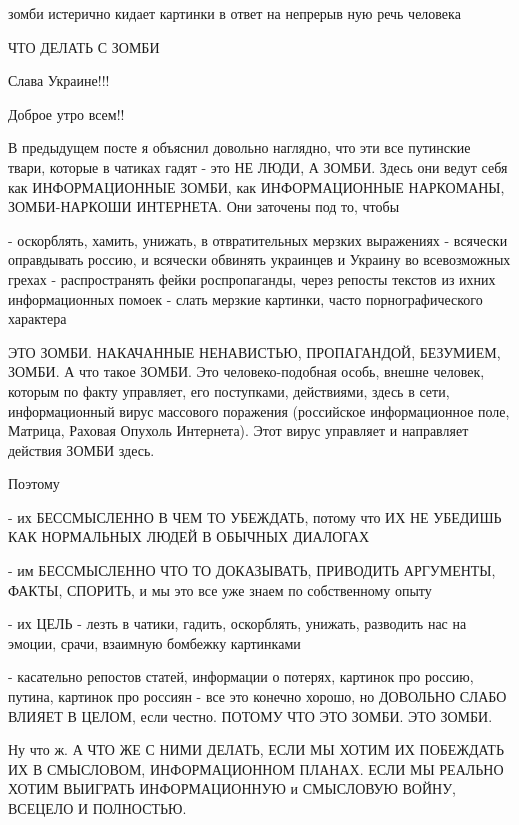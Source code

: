  
 
 
 
 

зомби 
истерично
кидает 
картинки
в ответ 
на 
непрерыв
ную
речь 
человека

ЧТО ДЕЛАТЬ С ЗОМБИ

Слава Украине!!! 💛 💙 💛 💙 💛 💙

Доброе утро всем!!

В предыдущем посте я объяснил довольно наглядно, что эти все путинские твари,
которые в чатиках гадят - это НЕ ЛЮДИ, А ЗОМБИ. Здесь они ведут себя как
ИНФОРМАЦИОННЫЕ ЗОМБИ, как ИНФОРМАЦИОННЫЕ НАРКОМАНЫ, ЗОМБИ-НАРКОШИ ИНТЕРНЕТА.
Они заточены под то, чтобы

- оскорблять, хамить, унижать, в отвратительных мерзких выражениях
- всячески оправдывать россию, и всячески обвинять украинцев и Украину
во всевозможных грехах
- распространять фейки роспропаганды, через репосты текстов из ихних информационных помоек
- слать мерзкие картинки, часто порнографического характера 

ЭТО ЗОМБИ. НАКАЧАННЫЕ НЕНАВИСТЬЮ, ПРОПАГАНДОЙ, БЕЗУМИЕМ, ЗОМБИ. А что такое
ЗОМБИ. Это человеко-подобная особь, внешне человек, которым по факту управляет,
его поступками, действиями, здесь в сети, информационный вирус массового
поражения (российское информационное поле, Матрица, Раховая Опухоль Интернета).
Этот вирус управляет и направляет действия ЗОМБИ здесь. 

Поэтому

- их БЕССМЫСЛЕННО В ЧЕМ ТО УБЕЖДАТЬ, потому что ИХ НЕ УБЕДИШЬ КАК НОРМАЛЬНЫХ
ЛЮДЕЙ В ОБЫЧНЫХ ДИАЛОГАХ

- им БЕССМЫСЛЕННО ЧТО ТО ДОКАЗЫВАТЬ, ПРИВОДИТЬ АРГУМЕНТЫ, ФАКТЫ, СПОРИТЬ, и мы
это все уже знаем по собственному опыту

- их ЦЕЛЬ - лезть в чатики, гадить, оскорблять, унижать, разводить нас на
эмоции, срачи, взаимную бомбежку картинками

- касательно репостов статей, информации о потерях, картинок про россию,
путина, картинок про россиян - все это конечно хорошо, но ДОВОЛЬНО СЛАБО ВЛИЯЕТ
В ЦЕЛОМ, если честно. ПОТОМУ ЧТО ЭТО ЗОМБИ. ЭТО ЗОМБИ.

Ну что ж. А ЧТО ЖЕ С НИМИ ДЕЛАТЬ, ЕСЛИ МЫ ХОТИМ ИХ ПОБЕЖДАТЬ ИХ В СМЫСЛОВОМ,
ИНФОРМАЦИОННОМ ПЛАНАХ. ЕСЛИ МЫ РЕАЛЬНО ХОТИМ ВЫИГРАТЬ ИНФОРМАЦИОННУЮ и
СМЫСЛОВУЮ ВОЙНУ, ВСЕЦЕЛО И ПОЛНОСТЬЮ.

